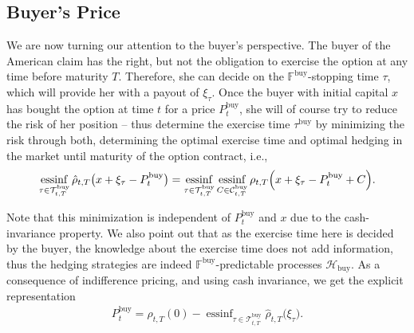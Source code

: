 \documentclass{article}
\DeclareMathOperator*{\essinf}{ess inf}
\begin{document}
\subsection{Buyer's Price}\label{sec:buy}

We are now turning our attention to the buyer's perspective. The buyer of the American claim has the right, but not the obligation to exercise the option at any time before maturity $T$. Therefore, she can decide on the $\mathbb{F}^\text{buy}$-stopping time $\tau$, which will provide her with a payout of $\xi_\tau$. Once the buyer with initial capital $x$ has bought the option at time $t$ for a price $P^\text{buy}_t$, she will of course try to reduce the risk of her position -- thus determine the exercise time $\tau^\text{buy}$ by minimizing the risk through both, determining the optimal exercise time and optimal hedging in the market until maturity of the option contract, i.e.,
\begin{equation*}
	\essinf_{\tau \in \mathcal{T}_{t,T}^\text{buy}} \hat{\rho}_{t,T} \bigl(x+ \xi_\tau - P^\text{buy}_t\bigr) =
	\essinf_{\tau \in \mathcal{T}_{t,T}^\text{buy}}\essinf_{C \in \mathcal{C}_{t,T}^\text{buy}} \rho_{t,T} \Bigl(x+ \xi_\tau - P^\text{buy}_t + C\Bigr).
\end{equation*}

Note that this minimization is independent of $P^\text{buy}_t$ and $x$ due to the cash-invariance property. We also point out that as the exercise time here is decided by the buyer, the knowledge about the exercise time does not add information, thus the hedging strategies are indeed $\mathbb{F}^\text{buy}$-predictable processes $\mathcal{H}_\text{buy}$. As a consequence of indifference pricing, and using cash invariance, we get the explicit representation 
\begin{align}\label{B}\tag{B}
	P_t^\text{buy} = \hat{\rho}_{t,T} (0) -  \essinf_{\tau \in \mathcal{T}_{t,T}^\text{buy}} \hat{\rho}_{t,T} \bigl( \xi_\tau\bigr).
\end{align}
\end{document}
